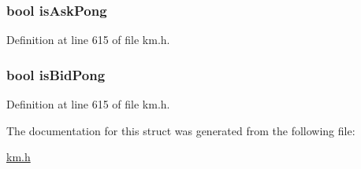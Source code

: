\subsubsection[{\texorpdfstring{is\+Ask\+Pong}{isAskPong}}]{\setlength{\rightskip}{0pt plus 5cm}bool is\+Ask\+Pong}\hypertarget{struct_k_1_1m_quote_af8d3a1e2055b25f8560bf9869ce14fe4}{}\label{struct_k_1_1m_quote_af8d3a1e2055b25f8560bf9869ce14fe4}


Definition at line 615 of file km.\+h.

\subsubsection[{\texorpdfstring{is\+Bid\+Pong}{isBidPong}}]{\setlength{\rightskip}{0pt plus 5cm}bool is\+Bid\+Pong}\hypertarget{struct_k_1_1m_quote_a1c64472cd941ada8dbb3d43fce0c133f}{}\label{struct_k_1_1m_quote_a1c64472cd941ada8dbb3d43fce0c133f}


Definition at line 615 of file km.\+h.



The documentation for this struct was generated from the following file\+:\begin{DoxyCompactItemize}
\item 
\hyperlink{km_8h}{km.\+h}\end{DoxyCompactItemize}
